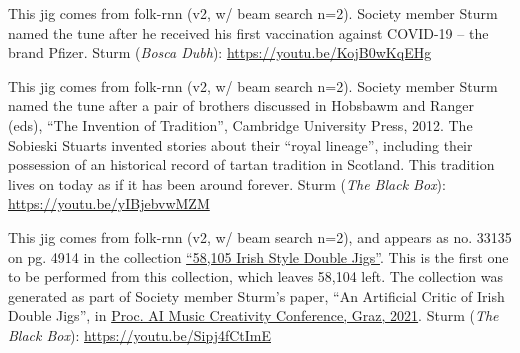 \documentclass[a4paper,notitlepage,twoside]{book}
\begin{document}
{}  
\hypertarget{jig:PfirstDoseofPfizer}{}
This jig comes from folk-rnn (v2, w/ beam search n=2). 
Society member Sturm named the tune after he received
his first vaccination against COVID-19 -- the brand Pfizer.
Sturm ({\em Bosca Dubh}): \url{https://youtu.be/KojB0wKqEHg}

{}  
\hypertarget{jig:SobieskiStuarts}{}
This jig comes from folk-rnn (v2, w/ beam search n=2). 
Society member Sturm named the tune after a pair of brothers
discussed in Hobsbawm and Ranger (eds), ``The Invention of Tradition'', Cambridge University Press, 2012.
The Sobieski Stuarts invented stories about their ``royal lineage'',
including their possession of an historical record of tartan tradition in Scotland.
This tradition lives on today as if it has been around forever.
Sturm ({\em The Black Box}): \url{https://youtu.be/yIBjebvwMZM}

{}  
\hypertarget{jig:58104togo}{}
This jig comes from folk-rnn (v2, w/ beam search n=2),
and appears as no. 33135 on pg. 4914 in the collection
\href{http://urn.kb.se/resolve?urn=urn:nbn:se:kth:diva-296578}{``58,105 Irish Style Double Jigs''}.
This is the first one to be performed from this collection,
which leaves 58,104 left.
The collection was generated as part of Society member Sturm's paper,
``An Artificial Critic of Irish Double Jigs'', in \href{https://aimc2021.iem.at/program/papers/}{Proc. AI Music Creativity Conference, Graz, 2021}.
Sturm ({\em The Black Box}): \url{https://youtu.be/Sipj4fCtImE}


\clearpage
\end{document}
